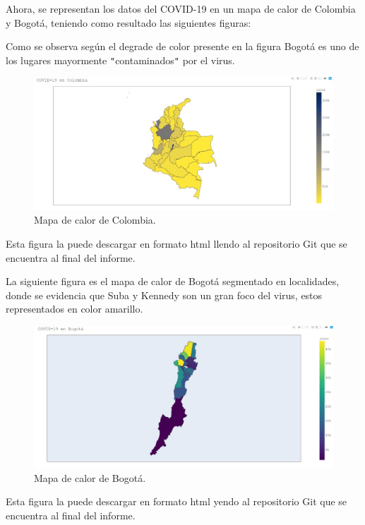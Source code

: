 \documentclass[conference,compsoc,onecolumn]{IEEEtran}
\begin{document}
Ahora, se representan los datos del COVID-19 en un mapa de calor de Colombia y Bogotá, teniendo como resultado las siguientes figuras:

\medskip

Como se observa según el degrade de color presente en la figura Bogotá es uno de los lugares mayormente \verb|"|contaminados\verb|"| por el virus.
\begin{figure}[H]
\centering
\includegraphics[width=18cm]{./images/colombia.jpeg}
\caption{Mapa de calor de Colombia.}
\label{fig:mesh1}
\end{figure}
Esta figura la puede descargar en formato html llendo al repositorio Git que se encuentra al final del informe.

\medskip

La siguiente figura es el mapa de calor de Bogotá segmentado en localidades, donde se evidencia que Suba y Kennedy son un gran foco del virus, estos representados en color amarillo.

\begin{figure}[H]
\centering
\includegraphics[width=18cm]{./images/bogota.jpeg}
\caption{Mapa de calor de Bogotá.}
\label{fig:mesh1}
\end{figure}
Esta figura la puede descargar en formato html yendo al repositorio Git que se encuentra al final del informe.
\end{document}
